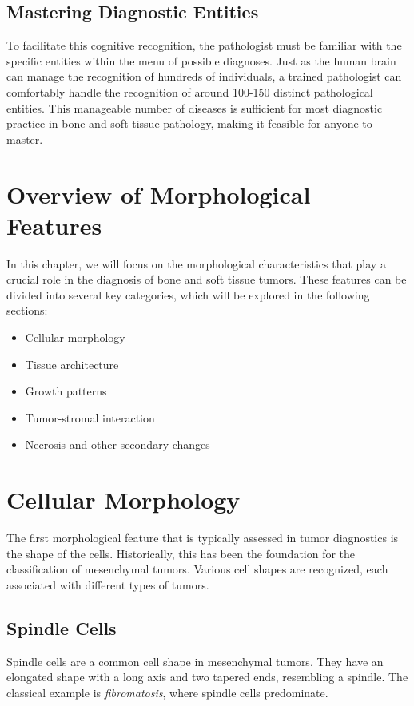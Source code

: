 \subsection{Mastering Diagnostic Entities}
To facilitate this cognitive recognition, the pathologist must be familiar with the specific entities within the menu of possible diagnoses. Just as the human brain can manage the recognition of hundreds of individuals, a trained pathologist can comfortably handle the recognition of around 100-150 distinct pathological entities. This manageable number of diseases is sufficient for most diagnostic practice in bone and soft tissue pathology, making it feasible for anyone to master.

\section{Overview of Morphological Features}
In this chapter, we will focus on the morphological characteristics that play a crucial role in the diagnosis of bone and soft tissue tumors. These features can be divided into several key categories, which will be explored in the following sections:
\begin{itemize}
    \item Cellular morphology
    \item Tissue architecture
    \item Growth patterns
    \item Tumor-stromal interaction
    \item Necrosis and other secondary changes
\end{itemize}

\section{Cellular Morphology}

The first morphological feature that is typically assessed in tumor diagnostics is the shape of the cells. Historically, this has been the foundation for the classification of mesenchymal tumors. Various cell shapes are recognized, each associated with different types of tumors.

\subsection{Spindle Cells}
Spindle cells are a common cell shape in mesenchymal tumors. They have an elongated shape with a long axis and two tapered ends, resembling a spindle. The classical example is \emph{fibromatosis}, where spindle cells predominate.

